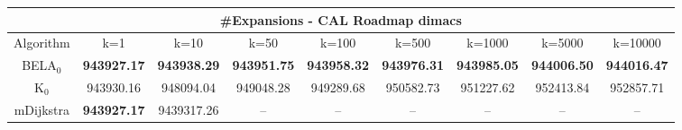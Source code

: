 \begin{tabular}{c|cccccccc}\toprule
\multicolumn{9}{c}{#Expansions - CAL Roadmap dimacs}\\ \midrule
Algorithm & k=1 & k=10 & k=50 & k=100 & k=500 & k=1000 & k=5000 & k=10000 \\ \midrule
BELA$_0$ & \textbf{943927.17} & \textbf{943938.29} & \textbf{943951.75} & \textbf{943958.32} & \textbf{943976.31} & \textbf{943985.05} & \textbf{944006.50} & \textbf{944016.47} \\
K$_0$ & 943930.16 & 948094.04 & 949048.28 & 949289.68 & 950582.73 & 951227.62 & 952413.84 & 952857.71 \\
mDijkstra & \textbf{943927.17} & 9439317.26 & -- & -- & -- & -- & -- & -- \\ \bottomrule 
\end{tabular}

